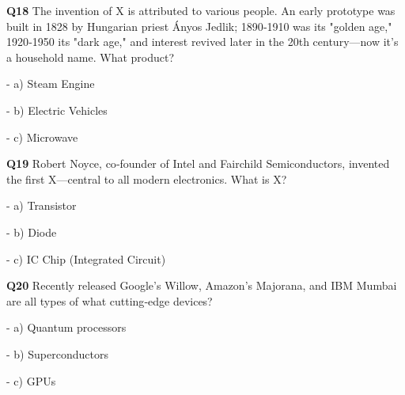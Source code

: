 \textbf{Q18} The invention of X is attributed to various people. An early prototype was built in 1828 by Hungarian priest Ányos Jedlik; 1890‑1910 was its "golden age," 1920‑1950 its "dark age," and interest revived later in the 20th century—now it's a household name. What product?\par
\quad - a) Steam Engine\par
\quad - b) Electric Vehicles\par
\quad - c) Microwave\par

\textbf{Q19} Robert Noyce, co‑founder of Intel and Fairchild Semiconductors, invented the first X—central to all modern electronics. What is X?\par
\quad - a) Transistor\par
\quad - b) Diode\par
\quad - c) IC Chip (Integrated Circuit)\par

\textbf{Q20} Recently released Google's Willow, Amazon's Majorana, and IBM Mumbai are all types of what cutting‑edge devices?\par
\quad - a) Quantum processors\par
\quad - b) Superconductors\par
\quad - c) GPUs\par